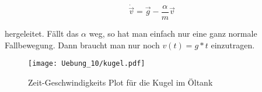 \begin{equation*}
\dot{\vec{v}} = \vec{g} - \frac{\alpha}{m} \vec{v}
\end{equation*}

hergeleitet. Fällt das $\alpha$ weg, so hat man einfach nur eine ganz normale Fallbewegung. Dann braucht man nur noch $v(t) = g*t$ einzutragen.

\begin{figure}[h]
\begin{center}
\texttt{[image: Uebung\_10/kugel.pdf]}
\caption{Zeit-Geschwindigkeits Plot für die Kugel im Öltank}
\end{center}
\end{figure}

